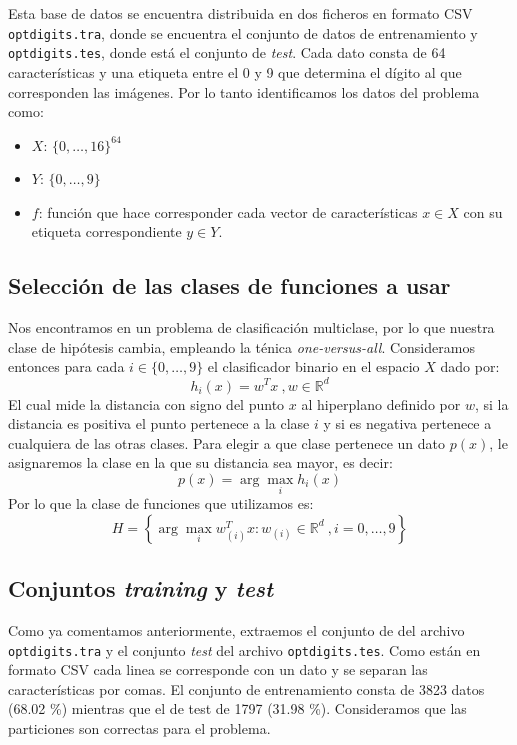 \documentclass[size=a4, parskip=half, titlepage=false, toc=flat, toc=bib, 12pt]{scrartcl}
\begin{document}
Esta base de datos se encuentra distribuida en dos ficheros en formato CSV \verb|optdigits.tra|, donde se encuentra el conjunto de datos de entrenamiento y \verb|optdigits.tes|, donde está el conjunto de \textit{test}. Cada dato consta de 64 características y una etiqueta entre el 0 y 9 que determina el dígito al que corresponden las imágenes. Por lo tanto identificamos los datos del problema como:
\begin{itemize}
\item $X$: $\{0, \dots , 16\}^{64}$
\item $Y$: $\{0, \dots, 9\}$
\item $f$: función que hace corresponder cada vector de características $x \in X$ con su etiqueta correspondiente $y \in Y$.
\end{itemize}

\newpage
\subsection{Selección de las clases de funciones a usar}
Nos encontramos en un problema de clasificación multiclase, por lo que nuestra clase de hipótesis cambia, empleando la ténica \textit{one-versus-all}. Consideramos entonces para cada $i \in \{0,\dots,9\}$ el clasificador binario en el espacio $X$ dado por:
$$h_i(x) = w^{T}x \ , w \in \mathbb{R}^d $$
El cual mide la distancia con signo del punto $x$ al hiperplano definido por $w$, si la distancia es positiva el punto pertenece a la clase $i$ y si es negativa pertenece a cualquiera de las otras clases. Para elegir a que clase pertenece un dato $p(x)$, le asignaremos la clase en la que su distancia sea mayor, es decir:
$$p(x) = \arg \max_i h_i(x) $$
Por lo que la clase de funciones que utilizamos es:
$$H = \left\{ \arg \max_i w_{(i)}^T x : w_{(i)} \in \mathbb{R}^d \ , i = 0, \dots , 9 \right\}$$


\subsection{Conjuntos \textit{training} y \textit{test}}

Como ya comentamos anteriormente, extraemos el conjunto de  del archivo \verb|optdigits.tra| y el conjunto \textit{test} del archivo \verb|optdigits.tes|. Como están en formato CSV cada linea se corresponde con un dato y se separan las características por comas. El conjunto de entrenamiento consta de 3823 datos (68.02 \%) mientras que el de test de 1797 (31.98 \%). Consideramos que las particiones son correctas para el problema.
\end{document}

